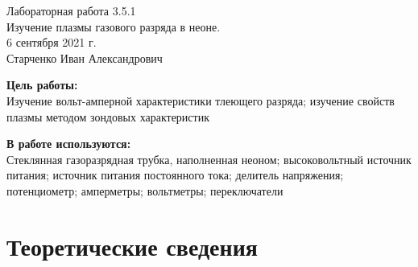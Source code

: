 




\setcounter{page}{1}



\begin{center}
  \LARGE{Лабораторная работа 3.5.1}\\[0.2cm]
  \LARGE{Изучение плазмы газового разряда в неоне.}\\[0.2cm]
  \large{6 сентября 2021 г.}\\[0.2cm]
  \large{Старченко Иван Александрович}\\[0.2cm]
\end{center}

\textbf{Цель работы:} \\
Изучение вольт-амперной характеристики тлеющего раз­ряда; изучение свойств плазмы методом зондовых характеристик

\textbf{В работе используются:} \\
Стеклянная газоразрядная трубка, наполнен­ная неоном; высоковольтный источник питания; источник питания посто­янного тока; делитель напряжения; потенциометр; амперметры; вольтмет­ры; переключатели
 


\section{Теоретические сведения}

